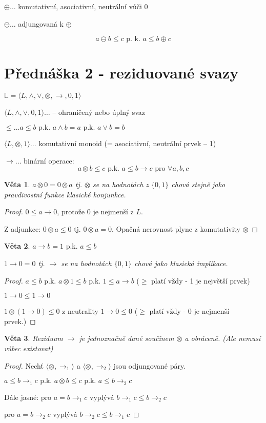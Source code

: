 \documentclass[10pt, a4paper, titlepage]{article}
\theoremstyle{note}
\newtheorem{veta}{Věta}
\newcommand{\pk}{\text{ p.k. }}
\newcommand{\rlat}{\langle L, \wedge, \vee,\otimes,\rightarrow,0,1\rangle}
\begin{document}
$\oplus\dots$ komutativní, asociativní, neutrální vůči 0

$\ominus\dots$ adjungovaná k $\oplus$

$$a\ominus b\leq c \text{ p. k. } a\leq b \oplus c$$

\section{Přednáška 2 - reziduované svazy}
$\mathbb{L} = \rlat$

$\langle L, \wedge,\vee, 0, 1\rangle \dots$ -- ohraničený nebo úplný svaz

$\leq \dots a\leq b \pk a \wedge b = a \pk a \vee b = b$

$\langle L, \otimes, 1\rangle\dots$ komutativní monoid (= asociativní, neutrální prvek -- 1)

$\rightarrow\dots$ binární operace: $$a\otimes b\leq c \pk a\leq b\rightarrow c \text{ pro } \forall a,b,c$$

\begin{veta}
$a\otimes 0 = 0\otimes a$ tj. $\otimes$ se na hodnotách z $\{0,1\}$ chová stejně jako pravdivostní funkce klasické konjunkce.
\end{veta}
\begin{proof}
$0\leq a \rightarrow 0$, protože $0$ je nejmenší z $L$.

Z adjunkce: $0\otimes a\leq 0$ tj. $0\otimes a=0$. Opačná nerovnost plyne z komutativity $\otimes$
\end{proof}
\begin{veta}
$a\rightarrow b = 1 \pk a\leq b$

$1\rightarrow 0 = 0$ tj. $\rightarrow$ se na hodnotách $\{0,1\}$ chová jako klasická implikace.
\end{veta}
\begin{proof}
$a\leq b \pk a\otimes 1\leq b\pk 1\leq a\rightarrow b$ ($\geq$ platí vždy - 1 je největší prvek)

$1\rightarrow 0\leq 1\rightarrow 0$

$1\otimes (1\rightarrow 0)\leq 0$ z neutrality $1\rightarrow 0\leq 0$ ($\geq$ platí vždy - 0 je nejmenší prvek.)
\end{proof}
\begin{veta}
Reziduum $\rightarrow$ je jednoznačně dané součinem $\otimes$ a obráceně. (Ale nemusí vůbec existovat)
\end{veta}
\begin{proof}
Nechť $\langle \otimes ,\rightarrow_{1}\rangle$ a $\langle \otimes ,\rightarrow_{2}\rangle$ jsou odjungované páry.

$a\leq b\rightarrow_{1} c\pk a\otimes b\leq c\pk a\leq b\rightarrow_{2} c$

Dále jasné: pro $a=b\rightarrow_{1} c$ vyplývá $b\rightarrow_{1} c\leq b\rightarrow_{2} c$

\hspace{51pt}pro $a=b\rightarrow_{2} c$ vyplývá $b\rightarrow_{2} c\leq b\rightarrow_{1} c$
\end{proof}
\end{document}
